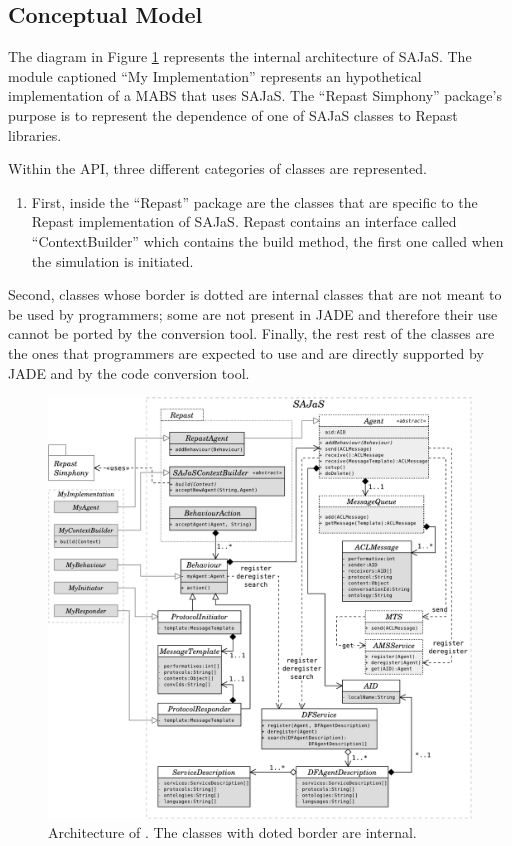 \subsection{Conceptual Model}
\label{sec:arch_conceptual}
The diagram in Figure \ref{fig:arch} represents the internal architecture of SAJaS. The module captioned ``My Implementation'' represents an hypothetical implementation of a MABS that uses SAJaS. The ``Repast Simphony'' package's purpose is to represent the dependence of one of SAJaS classes to Repast libraries.

Within the API, three different categories of classes are represented.

\begin{enumerate}
	\item First, inside the ``Repast'' package are the classes that are specific to the Repast implementation of SAJaS. Repast contains an interface called ``ContextBuilder'' which contains the build method, the first one called when the simulation is initiated.
\end{enumerate}


Second, classes whose border is dotted are internal classes that are not meant to be used by programmers; some are not present in JADE and therefore their use cannot be ported by the conversion tool. Finally, the rest rest of the classes are the ones that programmers are expected to use and are directly supported by JADE and by the code conversion tool.

\begin{figure}[h]
	\centering
	\includegraphics[width=\linewidth]{figures/sajas_arch.pdf}
	\caption[\apiname{}'s architecture]{Architecture of \apiname{}. The classes with doted border are internal.}
	\label{fig:arch}
\end{figure}

